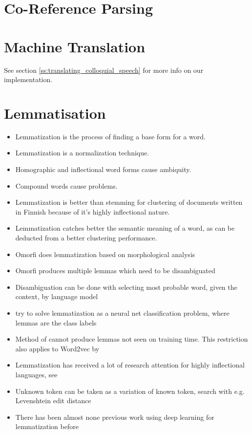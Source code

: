 \documentclass[12pt,a4paper,english
]{tutthesis}
\begin{document}
\section{Co-Reference Parsing}
\label{se:co-reference_parsing}

\section{Machine Translation}
\label{se:machine_translation}
See section \ref{ss:translating_colloquial_speech} for more info on our implementation.

\section{Lemmatisation}
\label{se:lemmatisation}
\begin{itemize}
\item Lemmatization is the process of finding a base form for a word.
\item Lemmatization is a normalization technique. \cite{Korenius2004}
\item Homographic and inflectional word forms cause ambiquity. \cite{Korenius2004}
\item Compound words cause problems. \cite{Korenius2004}
\item Lemmatization is better than stemming for clustering of documents written in Finnish because of it's highly inflectional nature. \cite{Korenius2004}
\item Lemmatization catches better the semantic meaning of a word, as can be deducted from a better clustering performance.
\item Omorfi does lemmatization based on morphological analysis
\item Omorfi produces multiple lemmas which need to be disambiguated
\item Disambiguation can be done with selecting most probable word, given the context, by language model
\item \cite{Kestemont2016} try to solve lemmatization as a neural net classification problem, where lemmas are the class labels
\item Method of \cite{Kestemont2016} cannot produce lemmas not seen on training time. This restriction also applies to Word2vec by \cite{Mikolov2013}
\item Lemmatization has received a lot of research attention for highly inflectional languages, see \cite{Kestermont2016}
\item Unknown token can be taken as a variation of known token, search with e.g. Levenshtein edit distance
\item There has been almost none previous work using deep learning for lemmatization before \cite{Kestemont2016}
\end{itemize}
\end{document}
